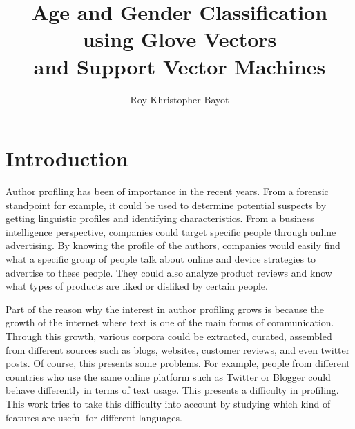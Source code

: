 \documentclass[a4paper]{llncs}
\begin{document}
\title{Age and Gender Classification\\
using Glove Vectors\\
and Support Vector Machines}
\titlerunning{}
\author{Roy Khristopher Bayot}

\maketitle

\section{Introduction}
Author profiling has been of importance in the recent years. From a forensic standpoint for example, it could be used to determine potential suspects by getting linguistic profiles and identifying characteristics. From a business intelligence perspective, companies could target specific people through online advertising. By knowing the profile of the authors, companies would easily find what a specific group of people talk about online and device strategies to advertise to these people. They could also analyze product reviews and know what types of products are liked or disliked by certain people. 

Part of the reason why the interest in author profiling grows is because the growth of the internet where text is one of the main forms of communication. Through this growth, various corpora could be extracted, curated, assembled from different sources such as blogs, websites, customer reviews, and even twitter posts. Of course, this presents some problems. For example, people from different countries who use the same online platform such as Twitter or Blogger could behave differently in terms of text usage. This presents a difficulty in profiling. This work tries to take this difficulty into account by studying which kind of features are useful for different languages. 
\end{document}
